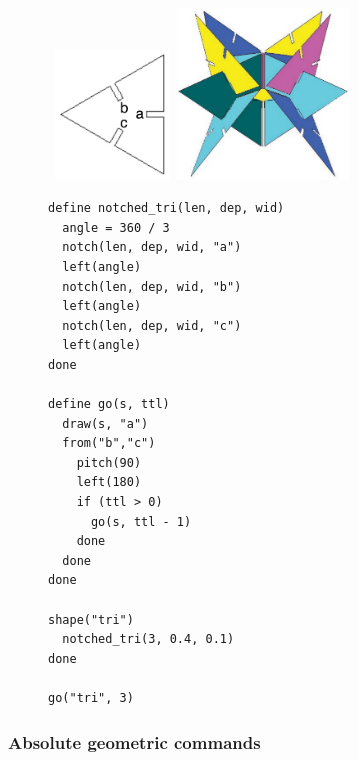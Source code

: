 \documentclass[times, 10pt,twocolumn]{article}
\makeatletter
\newenvironment{subfloat}%
{\def\caption##1{\gdef\subcapsave{\relax##1}}%
\let\subcapsave=\@empty %
\let\sf@oldlabel=\label 
\def\label##1{\xdef\sublabsave{\noexpand\label{##1}}}%
\let\sublabsave\relax %
\setbox\subfigbox\hbox 
\bgroup}%
{\egroup %
\let\label=\sf@oldlabel 
\subfigure[\subcapsave]{\box\subfigbox}}%
\makeatother
\begin{document}
\begin{figure}

  \begin{minipage}{}
    \begin{subfloat}
      \includegraphics[width=1.2in]{notched_triangle.pdf}
      \includegraphics[width=1.8in]{shapes-complete.pdf}
    \end{subfloat}
  \end{minipage}

  \begin{subfloat}
    \begin{minipage}{2.6in}
      \small
\begin{verbatim}
define notched_tri(len, dep, wid)
  angle = 360 / 3
  notch(len, dep, wid, "a")
  left(angle)
  notch(len, dep, wid, "b")
  left(angle)
  notch(len, dep, wid, "c")
  left(angle)
done

define go(s, ttl)
  draw(s, "a")
  from("b","c")
    pitch(90)
    left(180)
    if (ttl > 0)
      go(s, ttl - 1)
    done
  done
done

shape("tri")
  notched_tri(3, 0.4, 0.1)
done

go("tri", 3)
\end{verbatim}
    \end{minipage}
  \end{subfloat}
  \caption{Recursive \nohyphens{FlatLang} code storing a shape called
    `tri', drawing it from location `a', and drawing subsequent `tri'
    shapes from locations `b' and `c'. A single `tri' is shown at top
    left, the graphic output of this program is shown at top right.}
  \label{fig:shapes}
\end{figure}

\subsubsection{Absolute geometric commands}
\end{document}
